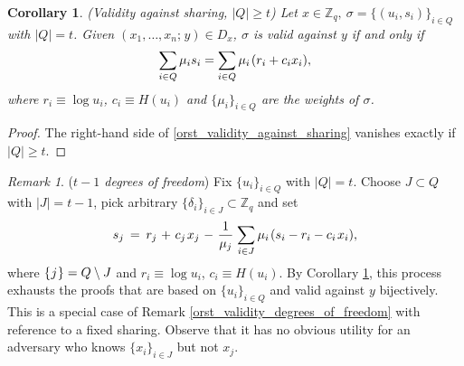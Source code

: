 \documentclass[10pt, psamsfonts, reqno]{amsart}
\newtheorem{cor}[thm]{Corollary}
\theoremstyle{definition}
\theoremstyle{remark}
\newtheorem{rem}[thm]{Remark}
\numberwithin{equation}{section}
\begin{document}
\begin{cor}\label{orst_validity_above_prop}
\textup{(\textit{Validity against sharing, $|Q| \ge t$})}
Let $x \in \mathbb{Z}_q,\ \sigma = \{(u_i, s_i)\}_{i \in Q}$
with $|Q| = t$.
Given $(x_1, \dots, x_n;\hspace{1pt} y) \in D_x$,
$\sigma$ is valid against $y$ if and only if
\vspace{5pt}
\begin{equation}\label{orst_validity_above}
\sum_{i \in Q} \mu_i s_i =
\sum_{i \in Q} \mu_i\hspace{1pt}(r_i + c_i x_i),
\vspace{5pt}
\end{equation}
where $r_i \equiv \log u_i$, $c_i \equiv H(u_i)$
and $\{\mu_i\}_{i \in Q}$
are the weights of $\sigma$.
\end{cor}
\begin{proof}
The right-hand side of \eqref{orst_validity_against_sharing}
vanishes exactly if $|Q| \ge t$.
\end{proof}

\begin{rem}\label{orst_t_1_degrees_of_freedom}
(\textit{$t-1$ degrees of freedom})
Fix $\{u_i\}_{i \in Q}$ with $|Q| = t$.
Choose $J \subset Q$ with $|J| = t - 1$,
pick arbitrary $\{\delta_i\}_{i \in J} \subset \mathbb{Z}_q$
and set
\vspace{5pt}
\begin{equation*}
s_j
	\hspace{2pt}
	=
	\hspace{2pt}
	r_j
	\hspace{1pt}
	+
	\hspace{1pt}
	c_j\hspace{1pt}x_j
	\hspace{1pt}
	-
	\hspace{1pt}
	\frac{1}{\mu_j}
	\hspace{1pt}
	\sum_{i \in J}
		\mu_i
		\hspace{1pt}
		(
			s_i - r_i - c_i\hspace{1pt}x_i
		),
\vspace{5pt}
\end{equation*}
where $\{\hspace{0.5pt}j\hspace{0.5pt}\} = Q \setminus J$ and
$r_i \equiv \log u_i$, $c_i \equiv H(u_i)$.
By Corollary \ref{orst_validity_above_prop},
this process exhausts the proofs
that are based on $\{u_i\}_{i \in Q}$
and valid against $y$ bijectively.
This is a special case of Remark
\ref{orst_validity_degrees_of_freedom}
with reference to a fixed sharing.
Observe that it has no obvious utility
for an adversary who knows $\{x_i\}_{i \in J}$
but not $x_j$.
\end{rem}
\end{document}
